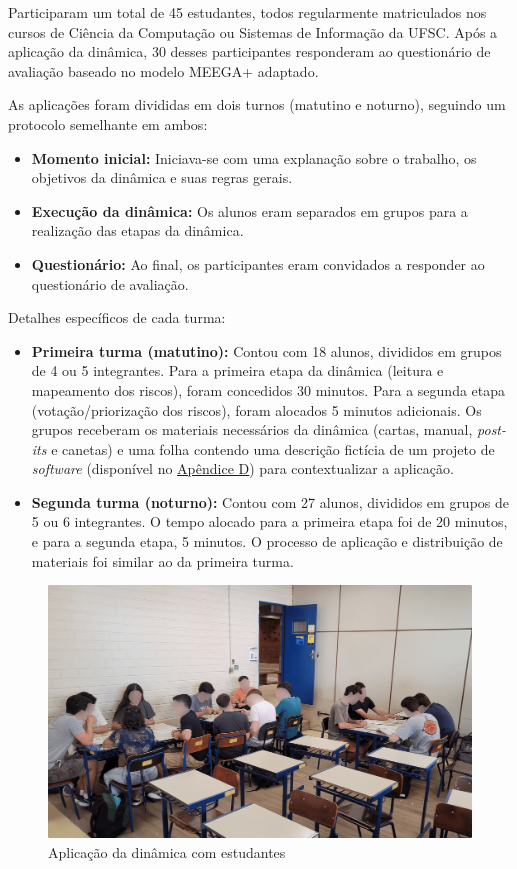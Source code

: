 \documentclass[
	12pt,
	openright,
	twoside,
	a4paper,
	english,
	brazil
	]{abntex2}
\begin{document}
Participaram um total de 45 estudantes, todos regularmente matriculados nos cursos de Ciência da Computação ou Sistemas de Informação da UFSC. Após a aplicação da dinâmica, 30 desses participantes responderam ao questionário de avaliação baseado no modelo MEEGA+ adaptado.

As aplicações foram divididas em dois turnos (matutino e noturno), seguindo um protocolo semelhante em ambos:

\begin{itemize}
  \item \textbf{Momento inicial:} Iniciava-se com uma explanação sobre o trabalho, os objetivos da dinâmica e suas regras gerais.
  \item \textbf{Execução da dinâmica:} Os alunos eram separados em grupos para a realização das etapas da dinâmica.
  \item \textbf{Questionário:} Ao final, os participantes eram convidados a responder ao questionário de avaliação.
\end{itemize}

Detalhes específicos de cada turma:

\begin{itemize}
  \item \textbf{Primeira turma (matutino):} Contou com 18 alunos, divididos em grupos de 4 ou 5 integrantes. Para a primeira etapa da dinâmica (leitura e mapeamento dos riscos), foram concedidos 30 minutos. Para a segunda etapa (votação/priorização dos riscos), foram alocados 5 minutos adicionais. Os grupos receberam os materiais necessários da dinâmica (cartas, manual, \textit{post-its} e canetas) e uma folha contendo uma descrição fictícia de um projeto de \textit{software} (disponível no \hyperref[apendiceD]{Apêndice D}) para contextualizar a aplicação.
  \item \textbf{Segunda turma (noturno):} Contou com 27 alunos, divididos em grupos de 5 ou 6 integrantes. O tempo alocado para a primeira etapa foi de 20 minutos, e para a segunda etapa, 5 minutos. O processo de aplicação e distribuição de materiais foi similar ao da primeira turma.
\end{itemize}

\begin{figure}[H]
  \centering
	\caption{\label{aplicacao-aula-alunos} Aplicação da dinâmica com estudantes}
  \includegraphics[width=\textwidth]{aplicacao-aula-alunos}
\end{figure}
\end{document}
